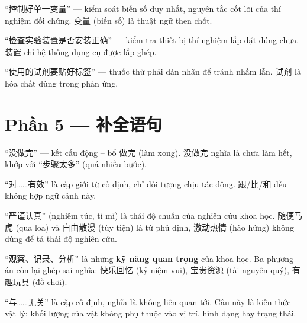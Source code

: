 \documentclass[11pt, a4paper]{article}
\begin{document}
\begin{dapan}[10 — Đáp án A]
“控制好单一变量” — kiểm soát biến số duy nhất, nguyên tắc cốt lõi của thí nghiệm đối chứng. 变量 (biến số) là thuật ngữ then chốt.
\end{dapan}

\begin{dapan}[11 — Đáp án B]
“检查实验装置是否安装正确” — kiểm tra thiết bị thí nghiệm lắp đặt đúng chưa. 装置 chỉ hệ thống dụng cụ được lắp ghép.
\end{dapan}

\begin{dapan}[12 — Đáp án C]
“使用的试剂要贴好标签” — thuốc thử phải dán nhãn để tránh nhầm lẫn. 试剂 là hóa chất dùng trong phản ứng.
\end{dapan}

\section*{Phần 5 — 补全语句}

\begin{dapan}[13 — Đáp án D]
“没做完” — kết cấu động – bổ 做完 (làm xong). 没做完 nghĩa là chưa làm hết, khớp với “步骤太多” (quá nhiều bước).
\end{dapan}

\begin{dapan}[14 — Đáp án A]
“对……有效” là cặp giới từ cố định, chỉ đối tượng chịu tác động. 跟/比/和 đều không hợp ngữ cảnh này.
\end{dapan}

\begin{dapan}[15 — Đáp án B]
“严谨认真” (nghiêm túc, tỉ mỉ) là thái độ chuẩn của nghiên cứu khoa học. 随便马虎 (qua loa) và 自由散漫 (tùy tiện) là từ phủ định, 激动热情 (hào hứng) không dùng để tả thái độ nghiên cứu.
\end{dapan}

\begin{dapan}[16 — Đáp án C]
“观察、记录、分析” là những \textbf{kỹ năng quan trọng} của khoa học. Ba phương án còn lại ghép sai nghĩa: 快乐回忆 (kỷ niệm vui), 宝贵资源 (tài nguyên quý), 有趣玩具 (đồ chơi).
\end{dapan}

\begin{dapan}[17 — Đáp án D]
“与……无关” là cặp cố định, nghĩa là không liên quan tới. Câu này là kiến thức vật lý: khối lượng của vật không phụ thuộc vào vị trí, hình dạng hay trạng thái.
\end{dapan}
\end{document}
